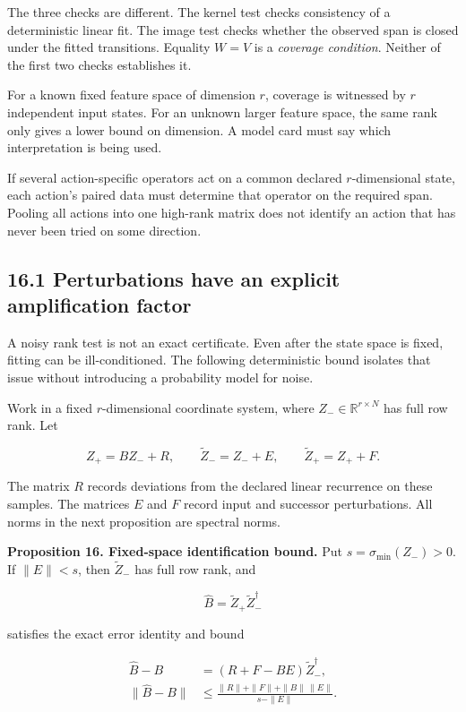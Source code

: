The three checks are different. The kernel test checks consistency of a
deterministic linear fit. The image test checks whether the observed
span is closed under the fitted transitions. Equality \(W=V\) is a
\emph{coverage condition}. Neither of the first two checks establishes
it.

For a known fixed feature space of dimension \(r\), coverage is
witnessed by \(r\) independent input states. For an unknown larger
feature space, the same rank only gives a lower bound on dimension. A
model card must say which interpretation is being used.

If several action-specific operators act on a common declared
\(r\)-dimensional state, each action's paired data must determine that
operator on the required span. Pooling all actions into one high-rank
matrix does not identify an action that has never been tried on some
direction.

\subsection{16.1 Perturbations have an explicit amplification
factor}\label{LSM:perturbations-have-an-explicit-amplification-factor}

A noisy rank test is not an exact certificate. Even after the state
space is fixed, fitting can be ill-conditioned. The following
deterministic bound isolates that issue without introducing a
probability model for noise.

Work in a fixed \(r\)-dimensional coordinate system, where
\(Z_-\in\mathbb R^{r\times N}\) has full row rank. Let

\[
Z_+=BZ_-+R,\qquad
\widetilde Z_-=Z_-+E,\qquad
\widetilde Z_+=Z_++F.
\]

The matrix \(R\) records deviations from the declared linear recurrence
on these samples. The matrices \(E\) and \(F\) record input and
successor perturbations. All norms in the next proposition are spectral
norms.

\textbf{Proposition 16. Fixed-space identification bound.} Put
\(s=\sigma_{\min}(Z_-)>0\). If \(\|E\|<s\), then \(\widetilde Z_-\) has
full row rank, and

\[
\widehat B=\widetilde Z_+\widetilde Z_-^\dagger
\]

satisfies the exact error identity and bound

\[
\begin{aligned}
\widehat B-B
&=(R+F-BE)\widetilde Z_-^\dagger,\\
\|\widehat B-B\|
&\leq\frac{\|R\|+\|F\|+\|B\|\,\|E\|}
{s-\|E\|}.
\end{aligned}
\]

